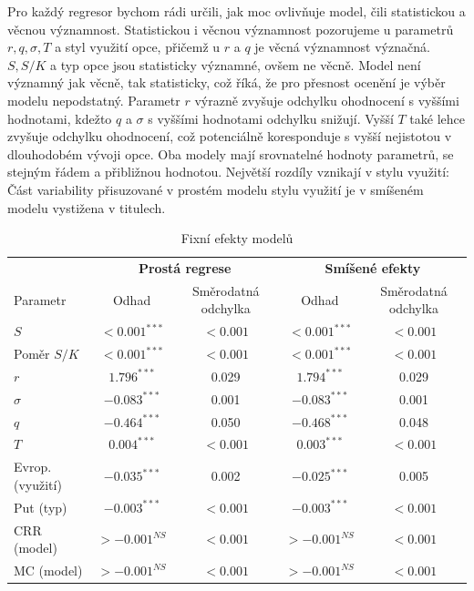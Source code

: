 \documentclass[male,czech,api_bc]{kitheses}
\begin{document}
  Pro každý regresor bychom rádi určili, jak moc ovlivňuje model, čili statistickou a věcnou významnost.
  Statistickou i věcnou významnost pozorujeme u parametrů $r, q, \sigma, T$ a styl využití opce, přičemž u $r$ a $q$ je věcná významnost význačná. $S, S/K$ a typ opce jsou statisticky významné, ovšem ne věcně. Model není významný jak věcně, tak statisticky, což říká, že pro přesnost ocenění je výběr modelu nepodstatný.
  Parametr $r$ výrazně zvyšuje odchylku ohodnocení s vyššími hodnotami, kdežto $q$ a $\sigma$ s vyššími hodnotami odchylku snižují. Vyšší $T$ také lehce zvyšuje odchylku ohodnocení, což potenciálně koresponduje s vyšší nejistotou v dlouhodobém vývoji opce.
  Oba modely mají srovnatelné hodnoty parametrů, se stejným řádem a přibližnou hodnotou. Největší rozdíly vznikají v stylu využití: Část variability přisuzované v prostém modelu stylu využití je v smíšeném modelu vystižena v titulech.

  \begin{table}[h!]
    \centering
    \caption{Fixní efekty modelů}
    \label{tab:your_mom}
    \begin{tabular}{l| cc | cc}
      \toprule
      & \multicolumn{2}{c}{\textbf{Prostá regrese}} & \multicolumn{2}{c}{\textbf{Smíšené efekty}} \\
      Parametr & Odhad & Směrodatná odchylka & Odhad & Směrodatná odchylka \\
      \midrule
      $S$ & $<0.001^{***}$ & $<0.001$ & $<0.001^{***}$ & $<0.001$ \\
      Poměr $S/K$ & $<0.001^{***}$ & $<0.001$ & $<0.001^{***}$ & $<0.001$ \\
      $r$ & $1.796^{***}$ & 0.029 & $1.794^{***}$ & 0.029 \\
      $\sigma$ & $-0.083^{***}$ & 0.001 & $-0.083^{***}$ & 0.001 \\
      $q$ & $-0.464^{***}$ & 0.050 & $-0.468^{***}$ & 0.048 \\
      $T$ & $0.004^{***}$ & $<0.001$ & $0.003^{***}$ & $<0.001$ \\
      Evrop. (využití) & $-0.035^{***}$ & 0.002 & $-0.025^{***}$ & 0.005 \\
      Put (typ) & $-0.003^{***}$ & $<0.001$ & $-0.003^{***}$ & $<0.001$ \\
      CRR (model) & $>-0.001^{NS}$ & $<0.001$ & $>-0.001^{NS}$ & $<0.001$ \\
      MC (model) & $>-0.001^{NS}$ & $<0.001$ & $>-0.001^{NS}$ & $<0.001$ \\
      \bottomrule
    \end{tabular}
  \end{table}
\end{document}
